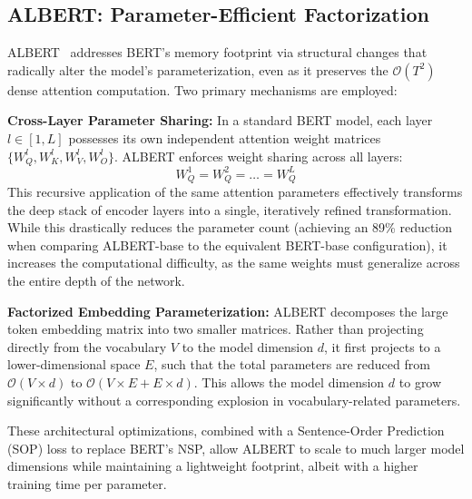 \documentclass[11pt]{article}
\begin{document}
\subsection{ALBERT: Parameter-Efficient Factorization}

ALBERT~\cite{lan2019albert} addresses BERT's memory footprint via structural changes that radically alter the model's parameterization, even as it preserves the $\mathcal{O}(T^2)$ dense attention computation. Two primary mechanisms are employed:

\textbf{Cross-Layer Parameter Sharing:} In a standard BERT model, each layer $l \in [1, L]$ possesses its own independent attention weight matrices $\{W_Q^l, W_K^l, W_V^l, W_O^l\}$. ALBERT enforces weight sharing across all layers:
\begin{equation}
  W_Q^1 = W_Q^2 = \dots = W_Q^L
\end{equation}
This recursive application of the same attention parameters effectively transforms the deep stack of encoder layers into a single, iteratively refined transformation. While this drastically reduces the parameter count (achieving an 89\% reduction when comparing ALBERT-base to the equivalent BERT-base configuration), it increases the computational difficulty, as the same weights must generalize across the entire depth of the network.

\textbf{Factorized Embedding Parameterization:} ALBERT decomposes the large token embedding matrix into two smaller matrices. Rather than projecting directly from the vocabulary $V$ to the model dimension $d$, it first projects to a lower-dimensional space $E$, such that the total parameters are reduced from $\mathcal{O}(V \times d)$ to $\mathcal{O}(V \times E + E \times d)$. This allows the model dimension $d$ to grow significantly without a corresponding explosion in vocabulary-related parameters.

These architectural optimizations, combined with a Sentence-Order Prediction (SOP) loss to replace BERT's NSP, allow ALBERT to scale to much larger model dimensions while maintaining a lightweight footprint, albeit with a higher training time per parameter.
\end{document}
